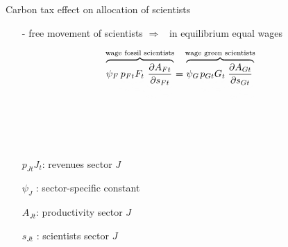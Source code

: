 \documentclass[11pt,aspectratio=169]{beamer}
\newcommand{\ar}{$\Rightarrow$ \ }
\begin{document}
\begin{frame}{Carbon tax effect on \alert{allocation of scientists}}
	\hypertarget{effcarscie}{}
	\begin{itemize}
		\item[-] free movement of scientists \ar in equilibrium equal wages
	\end{itemize}
	\pause
	\vspace{0mm}
	\large
	\begin{align*}		
		\color{black}
		\overbrace{{\psi_F} \textcolor{black!1}{\underbrace{\textcolor{black}{p_{Ft}{F_t}}}_{{{\tau_{Ft}\uparrow\Rightarrow\downarrow}}}}\textcolor{black!1}{\underbrace{\textcolor{black}{\frac{\partial A_{Ft}}{\partial s_{Ft}}}}_{{{s_{Ft}\downarrow\Rightarrow\uparrow}}}}}^{\text{wage fossil scientists}}{\pmb{=}}\overbrace{{\psi_G} \textcolor{black!1}{\underbrace{\textcolor{black}{p_{Gt}G_t}}_{{{\tau_{Ft}\uparrow\Rightarrow\uparrow}}}}\textcolor{black!1}{\underbrace{\textcolor{black}{\frac{\partial A_{Gt}}{\partial s_{Gt}}}}_{	{{s_{Gt}\uparrow\Rightarrow\downarrow}}}}}^{\text{wage green scientists}}
	\end{align*}
	\normalsize
	\vspace{-2mm}
	\begin{itemize}
		\item[] \ %
		\vspace{2mm}
		\item[] \  %
	\end{itemize}
	\small
	\vspace{4mm}
	\hspace{-2mm}
	\begin{minipage}[t!]{0.4\textwidth}
		\vspace{0mm}
		\begin{itemize}
			\item[] $p_{Jt}J_t$: revenues sector $J$
			\vspace{-2mm}
			\item[] $\psi_{J}$ : sector-specific constant
		\end{itemize}
	\end{minipage}
	\vspace{-5mm}
	\begin{minipage}[t!]{0.5\textwidth}
		\vspace{0mm}
		\begin{itemize}	
			\item[] $A_{Jt}$: productivity sector $J$
			\vspace{-2mm}			
			\item[] $s_{Jt}$ : scientists sector $J$
		\end{itemize}
	\end{minipage}
	
\end{frame}
\end{document}
